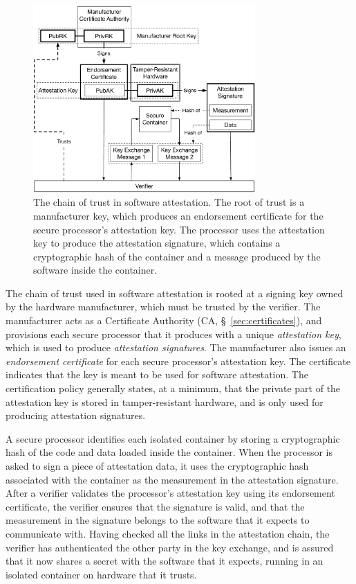 \begin{figure}[hbt]
  \centering
  \includegraphics[width=85mm]{figures/generic_attestation_chain.pdf}
  \caption{
    The chain of trust in software attestation. The root of trust is a
    manufacturer key, which produces an endorsement certificate for the secure
    processor's attestation key. The processor uses the attestation key to
    produce the attestation signature, which contains a cryptographic hash of
    the container and a message produced by the software inside the container.
  }
  \label{fig:generic_attestation_chain}
\end{figure}

The chain of trust used in software attestation is rooted at a signing key
owned by the hardware manufacturer, which must be trusted by the verifier. The
manufacturer acts as a Certificate Authority (CA, \S~\ref{sec:certificates}),
and provisions each secure processor that it produces with a unique
\textit{attestation key}, which is used to produce
\textit{attestation signatures}. The manufacturer also
issues an \textit{endorsement certificate} for each secure processor's
attestation key. The certificate indicates that the key is meant to be used for
software attestation. The certification policy generally states, at a minimum,
that the private part of the attestation key is stored in tamper-resistant
hardware, and is only used for producing attestation signatures.

A secure processor identifies each isolated container by storing a
cryptographic hash of the code and data loaded inside the container. When the
processor is asked to sign a piece of attestation data, it uses the
cryptographic hash associated with the container as the measurement in the
attestation signature. After a verifier validates the processor's attestation
key using its endorsement certificate, the verifier ensures that the signature
is valid, and that the measurement in the signature belongs to the software
that it expects to communicate with. Having checked all the links in the
attestation chain, the verifier has authenticated the other party in the key
exchange, and is assured that it now shares a secret with the software that it
expects, running in an isolated container on hardware that it trusts.


